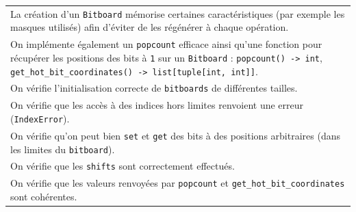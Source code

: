 \documentclass[a4paper,12pt]{article}
\begin{document}
\begin{tabularx}{\textwidth}{|X|}
    La création d’un \texttt{Bitboard} mémorise certaines caractéristiques (par exemple les masques utilisés) afin d’éviter de les régénérer à chaque opération.                                                                                                                                                                 \\
    On implémente également un \texttt{popcount} efficace ainsi qu’une fonction pour récupérer les positions des bits à \texttt{1} sur un \texttt{Bitboard} : \texttt{popcount() -> int}, \texttt{get\_hot\_bit\_coordinates() -> list[tuple[int, int]]}.                                                                        \\
    \arrayrulecolor{MediumAquamarine}\hline
    \arrayrulecolor{CornflowerBlue}
    On vérifie l’initialisation correcte de \texttt{bitboards} de différentes tailles.                                                                                                                                                                                                                                           \\
    On vérifie que les accès à des indices hors limites renvoient une erreur (\texttt{IndexError}).                                                                                                                                                                                                                              \\
    On vérifie qu’on peut bien \texttt{set} et \texttt{get} des bits à des positions arbitraires (dans les limites du \texttt{bitboard}).                                                                                                                                                                                        \\
    On vérifie que les \texttt{shifts} sont correctement effectués.                                                                                                                                                                                                                                                              \\
    On vérifie que les valeurs renvoyées par \texttt{popcount} et \texttt{get\_hot\_bit\_coordinates} sont cohérentes.                                                                                                                                                                                                           \\

\end{tabularx}
\end{document}
